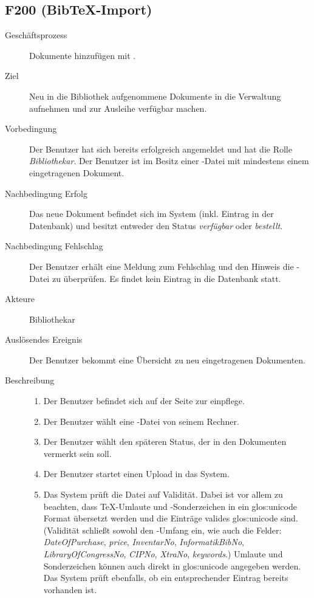 \subsection{F200 (Bib\TeX-Import)}
\begin{description}
  \item[Geschäftsprozess]Dokumente hinzufügen mit \BibTeX.
  \item[Ziel]Neu in die Bibliothek aufgenommene Dokumente in die Verwaltung aufnehmen und zur Ausleihe verfügbar machen.
  \item[Vorbedingung]Der Benutzer hat sich bereits erfolgreich angemeldet und hat die Rolle \emph{Bibliothekar}. Der Benutzer ist im Besitz einer \BibTeX -Datei mit mindestens einem eingetragenen Dokument.
  \item[Nachbedingung Erfolg]Das neue Dokument befindet sich im System (inkl. Eintrag in der Datenbank) und besitzt entweder den Status \emph{verfügbar} oder \emph{bestellt}.
  \item[Nachbedingung Fehlschlag]Der Benutzer erhält eine Meldung zum Fehlschlag und den Hinweis die \BibTeX -Datei zu überprüfen. Es findet kein Eintrag in die Datenbank statt.
  \item[Akteure]Bibliothekar
  \item[Auslösendes Ereignis]Der Benutzer bekommt eine Übersicht zu neu eingetragenen Dokumenten.
  \item[Beschreibung]\hfill
    \begin{enumerate}
      \item Der Benutzer befindet sich auf der Seite zur \BibTeX einpflege.
      \item Der Benutzer wählt eine \BibTeX -Datei von seinem Rechner.
      \item Der Benutzer wählt den späteren Status, der in den Dokumenten vermerkt sein soll.
      \item Der Benutzer startet einen Upload in das System.
      \item Das System prüft die Datei auf Validität. Dabei ist vor allem zu beachten, dass \TeX-Umlaute und -Sonderzeichen in ein \gls{glos:unicode} Format übersetzt werden und die Einträge valides \gls{glos:unicode} sind.
	(Validität schließt sowohl den \BibTeX -Umfang ein, wie auch die Felder: \emph{DateOfPurchase}, \emph{price}, \emph{InventarNo}, \emph{InformatikBibNo}, \emph{LibraryOfCongressNo}, \emph{CIPNo}, \emph{XtraNo}, \emph{keywords}.) Umlaute und Sonderzeichen können auch direkt in \gls{glos:unicode} angegeben werden.
	Das System prüft ebenfalls, ob ein entsprechender Eintrag bereits vorhanden ist.

\end{enumerate}
\end{description}
